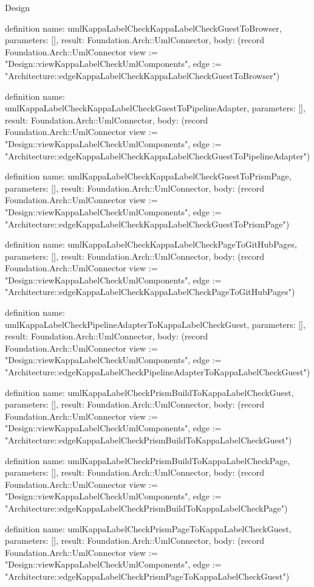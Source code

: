 \begin{lexlean}{Design}
\begin{semanticmodule}
definition{
  name: umlKappaLabelCheckKappaLabelCheckGuestToBrowser,
  parameters: [],
  result: Foundation.Arch::UmlConnector,
  body: (record Foundation.Arch::UmlConnector {view := "Design::viewKappaLabelCheckUmlComponents", edge := "Architecture::edgeKappaLabelCheckKappaLabelCheckGuestToBrowser"})
}

definition{
  name: umlKappaLabelCheckKappaLabelCheckGuestToPipelineAdapter,
  parameters: [],
  result: Foundation.Arch::UmlConnector,
  body: (record Foundation.Arch::UmlConnector {view := "Design::viewKappaLabelCheckUmlComponents", edge := "Architecture::edgeKappaLabelCheckKappaLabelCheckGuestToPipelineAdapter"})
}

definition{
  name: umlKappaLabelCheckKappaLabelCheckGuestToPrismPage,
  parameters: [],
  result: Foundation.Arch::UmlConnector,
  body: (record Foundation.Arch::UmlConnector {view := "Design::viewKappaLabelCheckUmlComponents", edge := "Architecture::edgeKappaLabelCheckKappaLabelCheckGuestToPrismPage"})
}

definition{
  name: umlKappaLabelCheckKappaLabelCheckPageToGitHubPages,
  parameters: [],
  result: Foundation.Arch::UmlConnector,
  body: (record Foundation.Arch::UmlConnector {view := "Design::viewKappaLabelCheckUmlComponents", edge := "Architecture::edgeKappaLabelCheckKappaLabelCheckPageToGitHubPages"})
}

definition{
  name: umlKappaLabelCheckPipelineAdapterToKappaLabelCheckGuest,
  parameters: [],
  result: Foundation.Arch::UmlConnector,
  body: (record Foundation.Arch::UmlConnector {view := "Design::viewKappaLabelCheckUmlComponents", edge := "Architecture::edgeKappaLabelCheckPipelineAdapterToKappaLabelCheckGuest"})
}

definition{
  name: umlKappaLabelCheckPrismBuildToKappaLabelCheckGuest,
  parameters: [],
  result: Foundation.Arch::UmlConnector,
  body: (record Foundation.Arch::UmlConnector {view := "Design::viewKappaLabelCheckUmlComponents", edge := "Architecture::edgeKappaLabelCheckPrismBuildToKappaLabelCheckGuest"})
}

definition{
  name: umlKappaLabelCheckPrismBuildToKappaLabelCheckPage,
  parameters: [],
  result: Foundation.Arch::UmlConnector,
  body: (record Foundation.Arch::UmlConnector {view := "Design::viewKappaLabelCheckUmlComponents", edge := "Architecture::edgeKappaLabelCheckPrismBuildToKappaLabelCheckPage"})
}

definition{
  name: umlKappaLabelCheckPrismPageToKappaLabelCheckGuest,
  parameters: [],
  result: Foundation.Arch::UmlConnector,
  body: (record Foundation.Arch::UmlConnector {view := "Design::viewKappaLabelCheckUmlComponents", edge := "Architecture::edgeKappaLabelCheckPrismPageToKappaLabelCheckGuest"})
}


\end{semanticmodule}
\end{lexlean}
